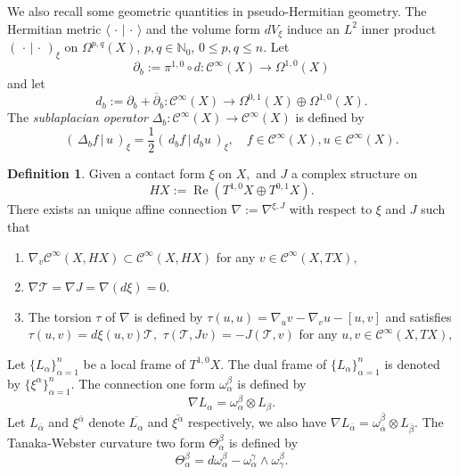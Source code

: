 \documentclass[12pt]{amsart}
\theoremstyle{definition}
\newtheorem{definition}[theorem]{Definition}
\theoremstyle{named}
\numberwithin{equation}{subsection}
\newcommand{\ddbar}{\overline\partial}
\newcommand{\pr}{\partial}
\newcommand{\To}{\rightarrow}
\def\cC{\mathscr{C}}
\begin{document}
We also recall some geometric quantities in pseudo-Hermitian geometry. The Hermitian metric $\langle\,\cdot\,|\,\cdot\,\rangle$ and the volume form $dV_\xi$ induce an $L^2$ inner product $(\,\cdot\,|\,\cdot\,)_\xi$ on $\Omega^{p,q}(X)$, $p, q\in\mathbb N_0$, $0\leq p,q\leq n$. Let 
\[\pr_b:=\pi^{1,0}\circ d: \cC^\infty(X)\To\Omega^{1,0}(X)\]
and let 
\[d_b:=\pr_b+\ddbar_b: \cC^\infty(X)\To\Omega^{0,1}(X)\oplus\Omega^{1,0}(X).\]
The \textit{sublaplacian operator} $\Delta_b:\cC^{\infty}(X)\rightarrow\cC^{\infty}(X)$ is defined by 
\begin{equation}\label{e-gue241122yyd}
(\,\Delta_b f\,|\,u\,)_\xi=\frac{1}{2}(\,d_bf\,|\,d_bu\,)_{\xi},\quad f\in\cC^\infty(X), u\in\cC^{\infty}(X).\end{equation}


\begin{definition}
    Given a contact form $\xi$ on $X,$ and $J$ a complex structure on $$HX:=\operatorname{Re}(T^{1,0}X\oplus T^{0,1}X).$$ There exists an unique affine connection $\nabla:=\nabla^{\xi,J}$ with respect to $\xi$ and $J$ such that
    \begin{enumerate}
        \item $\nabla_{v}\cC^\infty(X,HX)\subset\cC^\infty(X,HX)$ for any $v\in\cC^\infty(X,TX),$
        \item $\nabla\mathcal{T}=\nabla J=\nabla(d\xi)=0.$
        \item The torsion $\tau$ of $\nabla$ is defined by $\tau(u,u)=\nabla_u v-\nabla_vu-[u,v]$ and satisfies
        $\tau(u,v)=d\xi(u,v)\mathcal{T},$ $\tau(\mathcal{T},Jv)=-J(\mathcal{T},v)$ for any $u,v\in\cC^\infty(X,TX),$
    \end{enumerate}
\end{definition}
Let $\{L_\alpha\}_{\alpha=1}^n$ be a local frame of $T^{1,0}X$. The dual frame of $\{L_\alpha\}_{\alpha=1}^n$ is denoted by $\{\xi^{\alpha}\}_{\alpha=1}^n.$ The connection one form $\omega_\alpha^\beta$ is defined by
$$\nabla L_{\alpha}=\omega_\alpha^\beta\otimes L_{\beta}.$$
Let $L_{\overline{\alpha}}$ and $\xi^{\overline{\alpha}}$ denote $\overline{L_\alpha}$ and $\overline{\xi^{\alpha}}$ respectively, we also have $\nabla L_{\overline{\alpha}}=\omega^{\overline{\beta}}_{\overline{\alpha}}\otimes L_{\overline{\beta}}.$ The Tanaka-Webster curvature two form $\Theta_{\alpha}^{\beta}$ is defined by
\begin{equation}\label{eqn:def_tw2form}
\Theta_{\alpha}^{\beta}=d\omega_{\alpha}^{\beta}-\omega_\alpha^{\gamma}\wedge\omega_\gamma^{\beta}.
\end{equation}
\end{document}
